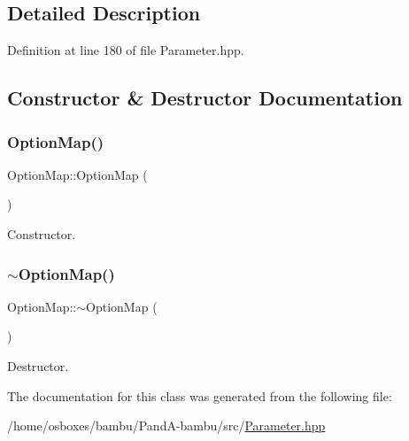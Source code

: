 \subsection{Detailed Description}


Definition at line 180 of file Parameter.\+hpp.



\subsection{Constructor \& Destructor Documentation}
\mbox{\label{classOptionMap_a700c0a7252b0d0134acdc5b41b388ffe}} 
\subsubsection{\texorpdfstring{Option\+Map()}{OptionMap()}}
{\footnotesize\ttfamily Option\+Map\+::\+Option\+Map (\begin{DoxyParamCaption}{ }\end{DoxyParamCaption})\hspace{0.3cm}{\ttfamily [default]}}



Constructor. 

\mbox{\label{classOptionMap_a48c7b4fba7d94f9c06d4b14ca0667a30}} 
\subsubsection{\texorpdfstring{$\sim$\+Option\+Map()}{~OptionMap()}}
{\footnotesize\ttfamily Option\+Map\+::$\sim$\+Option\+Map (\begin{DoxyParamCaption}{ }\end{DoxyParamCaption})\hspace{0.3cm}{\ttfamily [default]}}



Destructor. 



The documentation for this class was generated from the following file\+:\begin{DoxyCompactItemize}
\item 
/home/osboxes/bambu/\+Pand\+A-\/bambu/src/\hyperlink{Parameter_8hpp}{Parameter.\+hpp}\end{DoxyCompactItemize}
